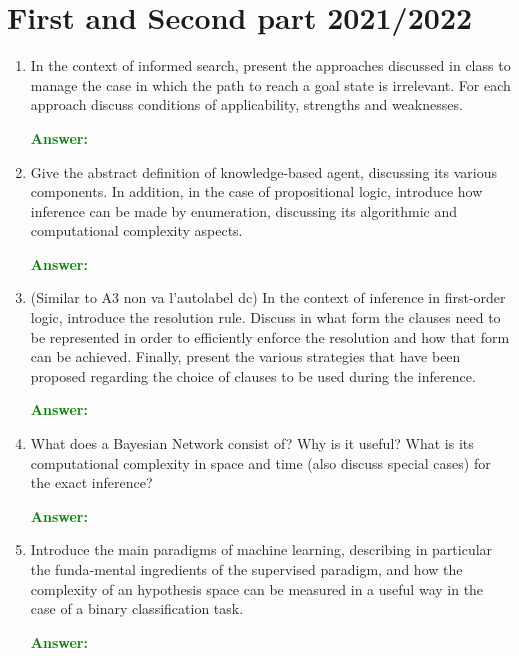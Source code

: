 \documentclass[12pt]{article}
\begin{document}
\section{First and Second part 2021/2022}
\begin{enumerate}[label=\textbf{B.\arabic*}]

    \item In the context of informed search, present the approaches discussed in class to manage the case in which the path to reach a goal state is irrelevant. 
    For each approach discuss conditions of applicability, strengths and weaknesses.
    
    \textcolor{green}{\textbf{Answer:}}

    \item Give the abstract definition of knowledge-based agent, discussing its various components. 
    In addition, in the case of propositional logic, introduce how inference can be made by enumeration, discussing its algorithmic and computational complexity aspects.

    \textcolor{green}{\textbf{Answer:}}

    \item (Similar to A3 non va l'autolabel dc) In the context of inference in first-order logic, introduce the resolution rule.
    Discuss in what form the clauses need to be represented in order to efficiently enforce the resolution and how that form can be achieved.
    Finally, present the various strategies that have been proposed regarding the choice of clauses to be used during the inference.

    \textcolor{green}{\textbf{Answer:}}

    \item What does a Bayesian Network consist of? 
    Why is it useful?
    What is its computational complexity in space and time (also discuss special cases) for the exact inference?

    \textcolor{green}{\textbf{Answer:}}

    \item Introduce the main paradigms of machine learning, describing in particular the funda-mental ingredients of the supervised paradigm, and how the complexity of an hypothesis space can be measured in a useful way in the case of a binary classification task.

    \textcolor{green}{\textbf{Answer:}}

\end{enumerate}
\end{document}
